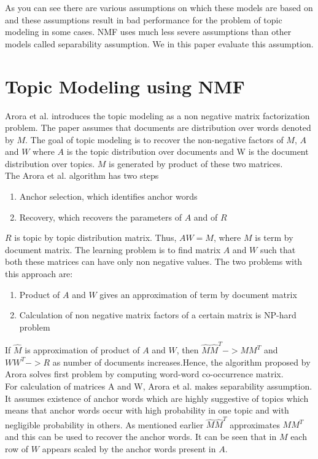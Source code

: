 \documentclass[a4paper,11pt]{article}
\begin{document}
As you can see there are various assumptions on which these models are based on and these assumptions result in bad performance for the problem of topic modeling in some cases. NMF uses much less severe assumptions than other models called separability assumption. We in this paper evaluate this assumption.


\section{Topic Modeling using NMF}
Arora et al. \cite{tm} introduces the topic modeling as a non negative matrix factorization problem. The paper assumes that documents are distribution over words denoted by $M$. The goal of topic modeling is to recover the non-negative factors of $M$, $A$ and $W$ where $A$ is the topic distribution over documents and W is the document distribution over topics. $M$ is generated by product of these two matrices.\\

The Arora et al. \cite{tm} algorithm has two steps

\begin{enumerate}
\item Anchor selection, which identifies anchor words
\item Recovery, which recovers the parameters of $A$ and of $R$
\end{enumerate}  

$R$ is topic by topic distribution matrix. Thus, $AW = M$, where $M$ is term by document matrix. The learning problem is to find matrix $A$ and $W$ such that both these matrices can have only non negative values. The two problems with this approach are: \\

\begin{enumerate}
\item Product of $A$ and $W$ gives an approximation of term by document matrix  
\item Calculation of non negative matrix factors of a certain matrix is NP-hard problem
\end{enumerate}

If $\hat{M}$  is approximation of product of $A$ and $W$, then $\hat{M} \hat{M}^T -> M M^T $ and $W W^T -> R$ as number of documents increases.Hence, the algorithm proposed by Arora solves first problem by computing word-word co-occurrence matrix. \\

For calculation of matrices A and W, Arora et al. \cite{tm} makes separability assumption. It assumes existence of anchor words which are highly suggestive of topics which means that anchor words occur with high probability in one topic and with negligible probability in others. As mentioned earlier $\hat{M} \hat{M}^T$ approximates $M M^T $ and this can be used to recover the anchor words. It can be seen that in $M$ each row of $W$ appears scaled by the anchor words present in $A$. \\
\end{document}
